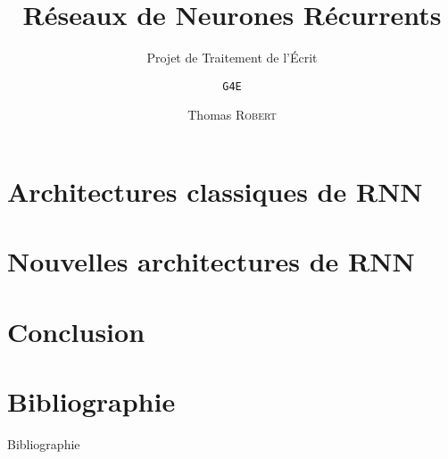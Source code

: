 \documentclass[compress,xcolor=table]{beamer}
\title{\LARGE Réseaux de Neurones Récurrents\newline{\Large \em Recurrent Neural Networks (RNN)\newline~}}
\subtitle{\large Projet de Traitement de l'Écrit}
\date{\formatdate{20}{2}{2015}}
\author{\texttt{G4E} \and Thomas \textsc{Robert}}
\institute{Université de Rouen}
\begin{document}


\section{Architectures classiques de RNN}


\section{Nouvelles architectures de RNN}


\section{Conclusion}


\section{Bibliographie}
\begin{frame}[allowframebreaks]{Bibliographie}


 \end{frame}
\end{document}
